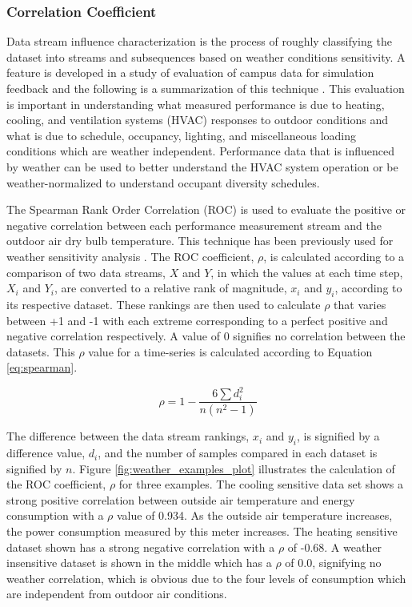 \subsubsection{Correlation Coefficient}
\label{sec:weathercorrelationcoeff}

Data stream influence characterization is the process of roughly classifying the dataset into streams and subsequences based on weather conditions sensitivity. A feature is developed in a study of evaluation of campus data for simulation feedback and the following is a summarization of this technique \cite{miller_forensically_2015}. This evaluation is important in understanding what measured performance is due to heating, cooling, and ventilation systems (HVAC) responses to outdoor conditions and what is due to schedule, occupancy, lighting, and miscellaneous loading conditions which are weather independent. Performance data that is influenced by weather can be used to better understand the HVAC system operation or be weather-normalized to understand occupant diversity schedules. %

The Spearman Rank Order Correlation (ROC) is used to evaluate the positive or negative correlation between each performance measurement stream and the outdoor air dry bulb temperature. This technique has been previously used for weather sensitivity analysis \cite{coughlin_statistical_2009}. The ROC coefficient, $\rho$, is calculated according to a comparison of two data streams, $X$ and $Y$, in which the values at each time step, $X_i$ and $Y_i$, are converted to a relative rank of magnitude, $x_i$ and $y_i$, according to its respective dataset. These rankings are then used to calculate $\rho$ that varies between +1 and -1 with each extreme corresponding to a perfect positive and negative correlation respectively. A value of 0 signifies no correlation between the datasets. This $\rho$ value for a time-series is calculated according to Equation \ref{eq:spearman}.

\begin{equation}
\rho = 1 - \frac{6\sum d_i^2}{n(n^2-1)}
\label{eq:spearman}
\end{equation}

The difference between the data stream rankings, $x_i$ and $y_i$, is signified by a difference value, $d_i$, and the number of samples compared in each dataset is signified by $n$. Figure \ref{fig:weather_examples_plot} illustrates the calculation of the ROC coefficient, $\rho$ for three examples. The cooling sensitive data set shows a strong positive correlation between outside air temperature and energy consumption with a $\rho$ value of 0.934. As the outside air temperature increases, the power consumption measured by this meter increases. The heating sensitive dataset shown has a strong negative correlation with a $\rho$ of -0.68. A weather insensitive dataset is shown in the middle which has a $\rho$ of 0.0, signifying no weather correlation, which is obvious due to the four levels of consumption which are independent from outdoor air conditions.